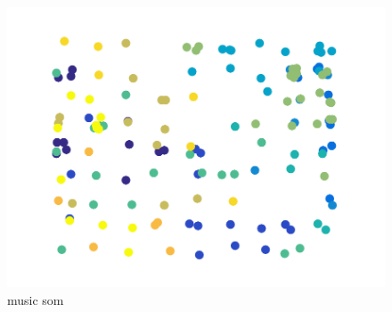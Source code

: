 \documentclass[12pt,a4paper,fleqn]{tufte-handout}
\begin{document}
 \begin{figure}
  \begin{center}
  \includegraphics[scale=.5]{figures/music_som}
  \caption{music som}
  \end{center}
  \end{figure}

  
  
  
 
 
  
\end{document}
